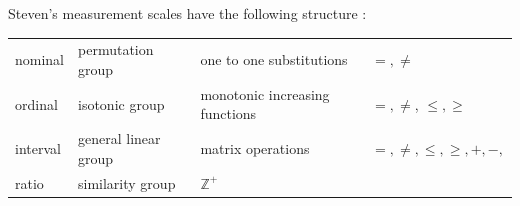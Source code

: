 \documentclass[letterpaper,onecolumn,titlepage]{Ythesis}
\begin{document}
Steven's measurement scales have the following structure \cite{stevensTheoryScalesMeasurement1946}:
\begin{table}
    \begin{tabular}{l l l l}
        nominal & permutation group & one to one substitutions & $=, \neq $\\
        ordinal & isotonic group & monotonic increasing functions &  $=, \neq $, $\leq, \geq$\\
        interval & general linear group & matrix operations &  $=, \neq, \leq, \geq, +, -, $\\
        ratio & similarity group & $ \mathbb{Z}^+ $ & 
    \end{tabular}
\end{table}

\end{document}

